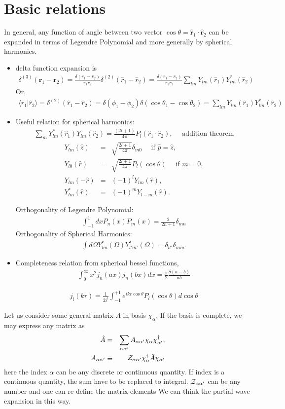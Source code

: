 \documentclass[10pt]{book}
\def\bm{\boldsymbol}
\newcommand{\bea}{\begin{eqnarray}}
\newcommand{\eea}{\end{eqnarray}}
\newcommand{\no}{\nonumber \\}
\def\vr{{\bm r}}
\def\la{\langle}
\def\ra{\rangle}
\begin{document}
\section{Basic relations}
In general, any function of angle between two vector $\cos\theta=\hat{\vr}_1\cdot\hat{\vr}_2$
can be expanded in terms of Legendre Polynomial and
more generally by spherical harmonics.
\begin{itemize}
\item delta function expansion is
\bea
\boxed{
\delta^{(3)}(\vr_1-\vr_2)=
 \frac{\delta(r_1-r_2)}{r_1 r_2}\delta^{(2)}(\hat{r}_1-\hat{r}_2)
 = 
 \frac{\delta(r_1-r_2)}{r_1 r_2}
 \sum_{lm} Y_{lm}(\hat{r}_1)Y^*_{lm}(\hat{r}_2) }
\eea
Or,
\bea
\la \hat{r}_1|\hat{r}_2\ra=\delta^{(2)}(\hat{r}_1-\hat{r}_2)
 =\delta(\phi_1-\phi_2)\delta(\cos\theta_1-\cos\theta_2)
=\sum_{lm} Y_{lm}(\hat{r}_1)Y^*_{lm}(\hat{r}_2)
\eea 
\item Useful relation for spherical harmonics:
\bea
\boxed{ 
\sum_{m} Y_{lm}^*(\hat{r}_1) Y_{lm}(\hat{r}_2)=
\frac{(2l+1)}{4\pi }P_l(\hat{r}_1\cdot\hat{r}_2),
 \quad \mbox{ addition theorem} }  
\eea 
\bea
Y_{lm}(\hat{z})&=&\sqrt{\frac{2l+1}{4\pi}}\delta_{m0}
       \quad \mbox{ if $\hat{p}=\hat{z}$},\no 
Y_{l0}(\hat{r})&=&\sqrt{\frac{2l+1}{4\pi}} P_l(\cos\theta)
       \quad \mbox{ if $m=0$},\no 
Y_{lm}(-\hat{r})&=& (-1)^l Y_{lm}(\hat{r}),\no 
Y_{lm}^*(\hat{r})&=& (-1)^m Y_{l-m}(\hat{r}).
\eea

Orthogonality of Legendre Polynomial:
\bea 
\int_{-1}^{1} dx P_n(x) P_m(x)=\frac{2}{2n+1}\delta_{mn}
\eea 
Orthogonality of Spherical Harmonics:
\bea 
\int d\Omega Y^*_{lm}(\Omega)Y^*_{l'm'}(\Omega)=\delta_{ll'}\delta_{mm'} 
\eea 
\item  Completeness relation from spherical bessel functions,
\bea
\boxed{
\int_0^\infty x^2 j_n(a x) j_n(b x)dx
=\frac{\pi}{2}\frac{\delta(a-b)}{ab}}
\eea

\bea 
j_l(kr)=\frac{1}{2i^l}\int_{-1}^{+1} e^{ikr\cos\theta} P_l(\cos\theta)d\cos\theta 
\eea 

\end{itemize}

Let us consider some general matrix $A$ in basis $\chi_\alpha$. 
If the basis is complete, we may express any matrix as
\bea 
\hat{A}&=&\sum_{\alpha\alpha'} A_{\alpha\alpha'}\chi_\alpha \chi^\dagger_{\alpha'},\no 
A_{\alpha\alpha'}&\equiv& {\cal Z}_{\alpha\alpha'} \chi^\dagger_\alpha \hat{A}\chi_{\alpha'} 
\eea 
here the index $\alpha$ can be any discrete or continuous quantity. 
If index is a continuous quantity, the sum have to be replaced to integral.
${\cal Z}_{\alpha\alpha'}$ can be any number and one can re-define the matrix elements
We can think the partial wave expansion in this way. 
\end{document}
